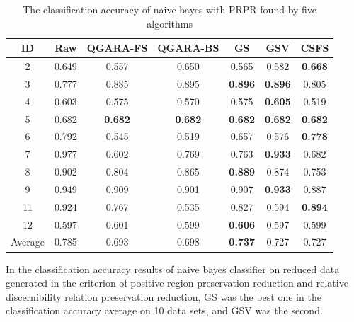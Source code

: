 \documentclass[review]{elsarticle}
\begin{document}
		\begin{table}[htb]
			\centering
			\caption{The classification accuracy of naive bayes with PRPR found by five algorithms}
			\begin{tabular}{ccccccc}
				\hline%
				ID    & Raw   & QGARA-FS & QGARA-BS & GS    & GSV   & CSFS \\
				\hline%
				2     & 0.649 & 0.557 & 0.650 & 0.565 & 0.582 & \textbf{0.668} \\
				3     & 0.777 & 0.885 & 0.895 & \textbf{0.896} & \textbf{0.896} & 0.805 \\
				4     & 0.603 & 0.575 & 0.570 & 0.575 & \textbf{0.605} & 0.519 \\
				5     & 0.682 & \textbf{0.682} & \textbf{0.682} & \textbf{0.682} & \textbf{0.682} & \textbf{0.682} \\
				6     & 0.792 & 0.545 & 0.519 & 0.657 & 0.576 & \textbf{0.778} \\
				7     & 0.977 & 0.602 & 0.769 & 0.763 & \textbf{0.933} & 0.682 \\
				8     & 0.902 & 0.804 & 0.865 & \textbf{0.889} & 0.874 & 0.753 \\
				9     & 0.949 & 0.909 & 0.901 & 0.907 & \textbf{0.933} & 0.887 \\
				11    & 0.924 & 0.767 & 0.535 & 0.827 & 0.594 & \textbf{0.894} \\
				12    & 0.597 & 0.601 & 0.599 & \textbf{0.606} & 0.597 & 0.599 \\
				\hline%
				Average & 0.785 & 0.693 & 0.698 & \textbf{0.737} & 0.727 & 0.727 \\
				\hline%
			\end{tabular}
			\label{canbp}
		\end{table}
		\par In the classification accuracy results of naive bayes classifier on reduced data generated in the criterion of positive region preservation reduction and relative discernibility relation preservation reduction, GS was the best one in the classification accuracy average on 10 data sets, and GSV was the second. 
\end{document}
